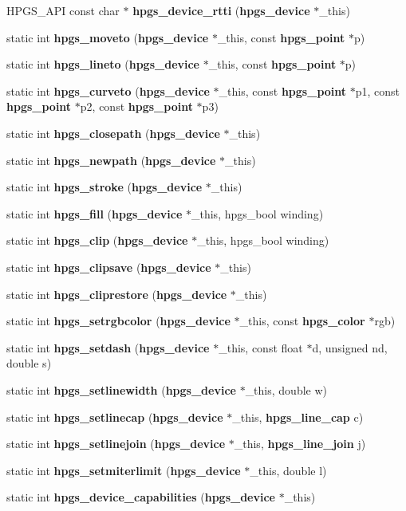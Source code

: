 \begin{CompactItemize}
\item 
HPGS\_\-API const char $\ast$ {\bf hpgs\_\-device\_\-rtti} ({\bf hpgs\_\-device} $\ast$\_\-this)
\item 
static int {\bf hpgs\_\-moveto} ({\bf hpgs\_\-device} $\ast$\_\-this, const {\bf hpgs\_\-point} $\ast$p)
\item 
static int {\bf hpgs\_\-lineto} ({\bf hpgs\_\-device} $\ast$\_\-this, const {\bf hpgs\_\-point} $\ast$p)
\item 
static int {\bf hpgs\_\-curveto} ({\bf hpgs\_\-device} $\ast$\_\-this, const {\bf hpgs\_\-point} $\ast$p1, const {\bf hpgs\_\-point} $\ast$p2, const {\bf hpgs\_\-point} $\ast$p3)
\item 
static int {\bf hpgs\_\-closepath} ({\bf hpgs\_\-device} $\ast$\_\-this)
\item 
static int {\bf hpgs\_\-newpath} ({\bf hpgs\_\-device} $\ast$\_\-this)
\item 
static int {\bf hpgs\_\-stroke} ({\bf hpgs\_\-device} $\ast$\_\-this)
\item 
static int {\bf hpgs\_\-fill} ({\bf hpgs\_\-device} $\ast$\_\-this, hpgs\_\-bool winding)
\item 
static int {\bf hpgs\_\-clip} ({\bf hpgs\_\-device} $\ast$\_\-this, hpgs\_\-bool winding)
\item 
static int {\bf hpgs\_\-clipsave} ({\bf hpgs\_\-device} $\ast$\_\-this)
\item 
static int {\bf hpgs\_\-cliprestore} ({\bf hpgs\_\-device} $\ast$\_\-this)
\item 
static int {\bf hpgs\_\-setrgbcolor} ({\bf hpgs\_\-device} $\ast$\_\-this, const {\bf hpgs\_\-color} $\ast$rgb)
\item 
static int {\bf hpgs\_\-setdash} ({\bf hpgs\_\-device} $\ast$\_\-this, const float $\ast$d, unsigned nd, double s)
\item 
static int {\bf hpgs\_\-setlinewidth} ({\bf hpgs\_\-device} $\ast$\_\-this, double w)
\item 
static int {\bf hpgs\_\-setlinecap} ({\bf hpgs\_\-device} $\ast$\_\-this, {\bf hpgs\_\-line\_\-cap} c)
\item 
static int {\bf hpgs\_\-setlinejoin} ({\bf hpgs\_\-device} $\ast$\_\-this, {\bf hpgs\_\-line\_\-join} j)
\item 
static int {\bf hpgs\_\-setmiterlimit} ({\bf hpgs\_\-device} $\ast$\_\-this, double l)
\item 
static int {\bf hpgs\_\-device\_\-capabilities} ({\bf hpgs\_\-device} $\ast$\_\-this)
\item 

\end{CompactItemize}
